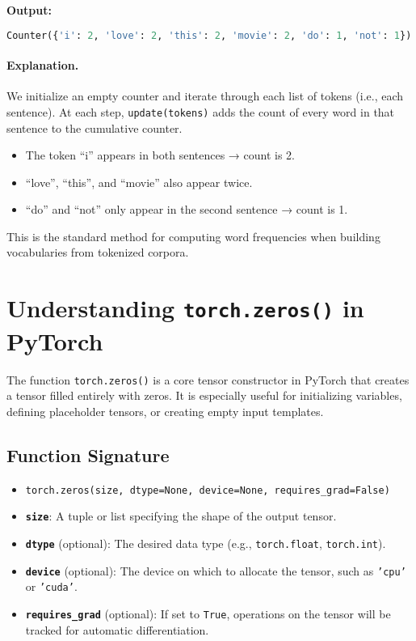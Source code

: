 \textbf{Output:}
\begin{lstlisting}[language=Python]
	Counter({'i': 2, 'love': 2, 'this': 2, 'movie': 2, 'do': 1, 'not': 1})
\end{lstlisting}

\paragraph{Explanation.}
We initialize an empty counter and iterate through each list of tokens (i.e., each sentence). At each step, \texttt{update(tokens)} adds the count of every word in that sentence to the cumulative counter.

\begin{itemize}
	\item The token ``i'' appears in both sentences → count is 2.
	\item ``love'', ``this'', and ``movie'' also appear twice.
	\item ``do'' and ``not'' only appear in the second sentence → count is 1.
\end{itemize}

This is the standard method for computing word frequencies when building vocabularies from tokenized corpora.

\section{Understanding \texttt{torch.zeros()} in PyTorch}

The function \texttt{torch.zeros()} is a core tensor constructor in PyTorch that creates a tensor filled entirely with zeros. It is especially useful for initializing variables, defining placeholder tensors, or creating empty input templates.

\subsection{Function Signature}
\begin{itemize}
	\item \texttt{torch.zeros(size, dtype=None, device=None, requires\_grad=False)}
\end{itemize}

\begin{itemize}
	\item \textbf{\texttt{size}}: A tuple or list specifying the shape of the output tensor.
	\item \textbf{\texttt{dtype}} (optional): The desired data type (e.g., \texttt{torch.float}, \texttt{torch.int}).
	\item \textbf{\texttt{device}} (optional): The device on which to allocate the tensor, such as \texttt{'cpu'} or \texttt{'cuda'}.
	\item \textbf{\texttt{requires\_grad}} (optional): If set to \texttt{True}, operations on the tensor will be tracked for automatic differentiation.
\end{itemize}

